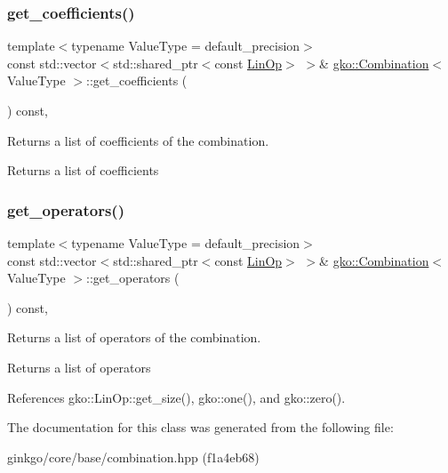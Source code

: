 \subsubsection{\texorpdfstring{get\+\_\+coefficients()}{get\_coefficients()}}
{\footnotesize\ttfamily template$<$typename Value\+Type  = default\+\_\+precision$>$ \\
const std\+::vector$<$std\+::shared\+\_\+ptr$<$const \hyperlink{classgko_1_1LinOp}{Lin\+Op}$>$ $>$\& \hyperlink{classgko_1_1Combination}{gko\+::\+Combination}$<$ Value\+Type $>$\+::get\+\_\+coefficients (\begin{DoxyParamCaption}{ }\end{DoxyParamCaption}) const\hspace{0.3cm}{\ttfamily [inline]}, {\ttfamily [noexcept]}}



Returns a list of coefficients of the combination. 

\begin{DoxyReturn}{Returns}
a list of coefficients 
\end{DoxyReturn}
\mbox{\label{classgko_1_1Combination_a75a81c2b91441ddea98949ef54f62441}} 
\subsubsection{\texorpdfstring{get\+\_\+operators()}{get\_operators()}}
{\footnotesize\ttfamily template$<$typename Value\+Type  = default\+\_\+precision$>$ \\
const std\+::vector$<$std\+::shared\+\_\+ptr$<$const \hyperlink{classgko_1_1LinOp}{Lin\+Op}$>$ $>$\& \hyperlink{classgko_1_1Combination}{gko\+::\+Combination}$<$ Value\+Type $>$\+::get\+\_\+operators (\begin{DoxyParamCaption}{ }\end{DoxyParamCaption}) const\hspace{0.3cm}{\ttfamily [inline]}, {\ttfamily [noexcept]}}



Returns a list of operators of the combination. 

\begin{DoxyReturn}{Returns}
a list of operators 
\end{DoxyReturn}


References gko\+::\+Lin\+Op\+::get\+\_\+size(), gko\+::one(), and gko\+::zero().



The documentation for this class was generated from the following file\+:\begin{DoxyCompactItemize}
\item 
ginkgo/core/base/combination.\+hpp (f1a4eb68)\end{DoxyCompactItemize}
